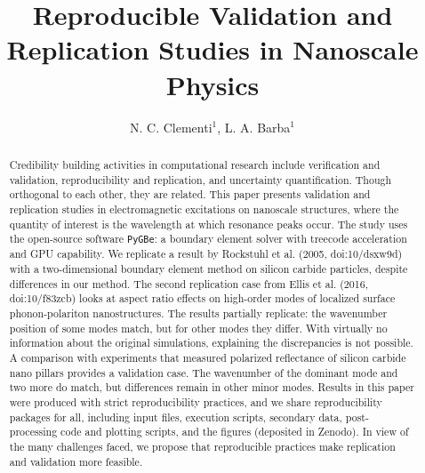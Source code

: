 \documentclass{rstransa} %
\newcommand{\pygbe}{\texttt{PyGBe}\xspace}
\begin{document}
\title{Reproducible Validation and Replication Studies in Nanoscale Physics}

\author{%
N. C. Clementi$^{1}$, L. A. Barba$^{1}$}

\address{$^{1}$Department of Mechanical and Aerospace Engineering, 
The George Washington University, Washington D.C., USA }

\subject{computer modeling and simulation, computational physics}



\begin{abstract}
    Credibility building activities in computational research include
    verification and validation, reproducibility and replication, and
    uncertainty quantification. Though orthogonal to each other, they are
    related. This paper presents validation and replication studies in 
    electromagnetic excitations on nanoscale structures, where the quantity
    of interest is the wavelength at which resonance peaks occur. 
    The study uses the open-source software \pygbe: a boundary element
    solver with treecode acceleration and GPU capability.
    We replicate a result by Rockstuhl et al. (2005, doi:10/dsxw9d) with a
    two-dimensional boundary element method on silicon carbide particles,
    despite differences in our method. 
    The second replication case from Ellis et al. (2016, doi:10/f83zcb) looks
    at aspect ratio effects on high-order modes of localized surface phonon-polariton
    nanostructures. The results partially replicate: the wavenumber
    position of some modes match, but for other modes they differ.
    With virtually no information about the original simulations, 
    explaining the discrepancies is not possible. 
    A comparison with experiments that measured polarized reflectance 
    of silicon carbide nano pillars provides a validation case.
    The wavenumber of the dominant mode and two more do match, but 
    differences remain in other minor modes. 
    Results in this paper were produced with strict reproducibility
    practices, and we share reproducibility packages for all, including
    input files, execution scripts, secondary data, post-processing code and
    plotting scripts, and the figures (deposited in Zenodo).
    In view of the many challenges faced, we propose that reproducible
    practices make replication and validation more feasible.

    \end{abstract}
    
\end{document}
